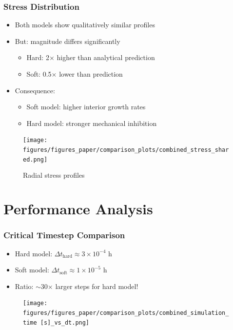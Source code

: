 \documentclass[
	10pt,
	t
]{beamer}
\begin{document}
\begin{frame}
    \frametitle{Stress Distribution}

    \begin{itemize}
        \item Both models show qualitatively similar profiles
        \item But: magnitude differs significantly
              \begin{itemize}
                  \item Hard: 2$\times$ higher than analytical prediction
                  \item Soft: 0.5$\times$ lower than prediction
              \end{itemize}
        \item Consequence:
              \begin{itemize}
                  \item Soft model: higher interior growth rates
                  \item Hard model: stronger mechanical inhibition
              \end{itemize}
    \end{itemize}

    \vspace{0.2cm}

    \begin{figure}
        \centering
        \texttt{[image: figures/figures\_paper/comparison\_plots/combined\_stress\_shared.png]}
        \caption{\scriptsize{Radial stress profiles}}
    \end{figure}

\end{frame}

\section{Performance Analysis}

\begin{frame}
    \frametitle{Critical Timestep Comparison}

    \begin{itemize}
        \item Hard model: $\Delta t_{\text{hard}} \approx 3 \times 10^{-4}$ h
        \item Soft model: $\Delta t_{\text{soft}} \approx 1 \times 10^{-5}$ h
        \item Ratio: $\sim$30$\times$ larger steps for hard model!
    \end{itemize}

    \vspace{0.2cm}

    \begin{figure}
        \centering
        \texttt{[image: figures/figures\_paper/comparison\_plots/combined\_simulation\_time [s]\_vs\_dt.png]}
    \end{figure}

\end{frame}
\end{document}
